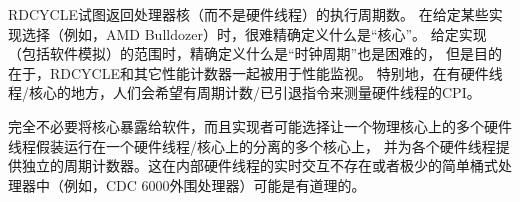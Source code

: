 \begin{commentary}
  RDCYCLE试图返回处理器核（而不是硬件线程）的执行周期数。
  在给定某些实现选择（例如，AMD Bulldozer）时，很难精确定义什么是“核心”。
  给定实现（包括软件模拟）的范围时，精确定义什么是“时钟周期”也是困难的，
  但是目的在于，RDCYCLE和其它性能计数器一起被用于性能监视。
  特别地，在有硬件线程/核心的地方，人们会希望有周期计数/已引退指令来测量硬件线程的CPI。

完全不必要将核心暴露给软件，而且实现者可能选择让一个物理核心上的多个硬件线程假装运行在一个硬件线程/核心上的分离的多个核心上，
并为各个硬件线程提供独立的周期计数器。这在内部硬件线程的实时交互不存在或者极少的简单桶式处理器中（例如，CDC 6000外围处理器）可能是有道理的。


\end{commentary}
